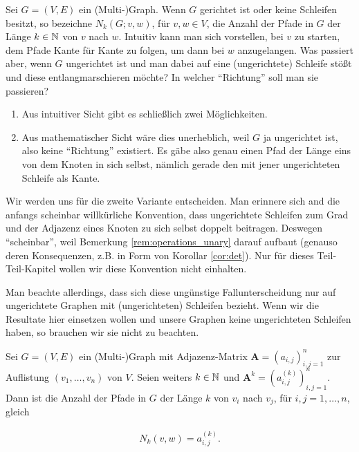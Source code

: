         Sei $G = (V, E)$ ein (Multi-)Graph.
        Wenn $G$ gerichtet ist oder keine Schleifen besitzt, so bezeichne $N_k(G; v, w)$, für $v, w \in V$, die Anzahl der Pfade in $G$ der Länge $k \in \mathbb N$ von $v$ nach $w$.
        Intuitiv kann man sich vorstellen, bei $v$ zu starten, dem Pfade Kante für Kante zu folgen, um dann bei $w$ anzugelangen.
        Was passiert aber, wenn $G$ ungerichtet ist und man dabei auf eine (ungerichtete) Schleife stößt und diese entlangmarschieren möchte?
        In welcher \enquote{Richtung} soll man sie passieren?

        \begin{enumerate}[label = \arabic*.]

            \item Aus intuitiver Sicht gibt es schließlich zwei Möglichkeiten.

            \item Aus mathematischer Sicht wäre dies unerheblich, weil $G$ ja ungerichtet ist, also keine \enquote{Richtung} existiert.
            Es gäbe also genau einen Pfad der Länge eins von dem Knoten in sich selbst, nämlich gerade den mit jener ungerichteten Schleife als Kante.

        \end{enumerate}

        Wir werden uns für die zweite Variante entscheiden.
        Man erinnere sich and die anfangs scheinbar willkürliche Konvention, dass ungerichtete Schleifen zum Grad und der Adjazenz eines Knoten zu sich selbst doppelt beitragen.
        Deswegen \enquote{scheinbar}, weil Bemerkung \ref{rem:operations_unary} darauf aufbaut (genauso deren Konsequenzen, z.B. in Form von Korollar \ref{cor:det}).
        Nur für dieses Teil-Teil-Kapitel wollen wir diese Konvention nicht einhalten.

        Man beachte allerdings, dass sich diese ungünstige Fallunterscheidung nur auf ungerichtete Graphen mit (ungerichteten) Schleifen bezieht.
        Wenn wir die Resultate hier einsetzen wollen und unsere Graphen keine ungerichteten Schleifen haben, so brauchen wir sie nicht zu beachten.

        \begin{theorem} \label{thm:number_of_paths}

            Sei $G = (V, E)$ ein (Multi-)Graph mit Adjazenz-Matrix $\mathbf A = (a_{i,j})_{i,j=1}^n$ zur Auflistung $(v_1, \dots, v_n)$ von $V$.
            Seien weiters $k \in \mathbb N$ und $\mathbf A^k = (a_{i,j}^{(k)})_{i,j=1}^n$.
            Dann ist die Anzahl der Pfade in $G$ der Länge $k$ von $v_i$ nach $v_j$, für $i, j = 1, \dots, n$, gleich

            \begin{align*}
                N_k(v, w) = a_{i,j}^{(k)}.
            \end{align*}

        \end{theorem}

